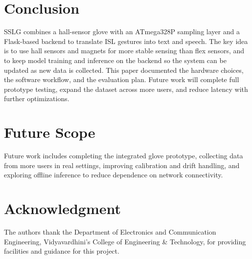 \documentclass[conference]{IEEEtran}
\begin{document}
\section{Conclusion}
SSLG combines a hall-sensor glove with an ATmega328P sampling layer and a Flask-based backend to translate ISL gestures into text and speech. The key idea is to use hall sensors and magnets for more stable sensing than flex sensors, and to keep model training and inference on the backend so the system can be updated as new data is collected. This paper documented the hardware choices, the software workflow, and the evaluation plan. Future work will complete full prototype testing, expand the dataset across more users, and reduce latency with further optimizations.

\section{Future Scope}
Future work includes completing the integrated glove prototype, collecting data from more users in real settings, improving calibration and drift handling, and exploring offline inference to reduce dependence on network connectivity.

\section*{Acknowledgment}
The authors thank the Department of Electronics and Communication Engineering, Vidyavardhini's College of Engineering \& Technology, for providing facilities and guidance for this project.
\end{document}
